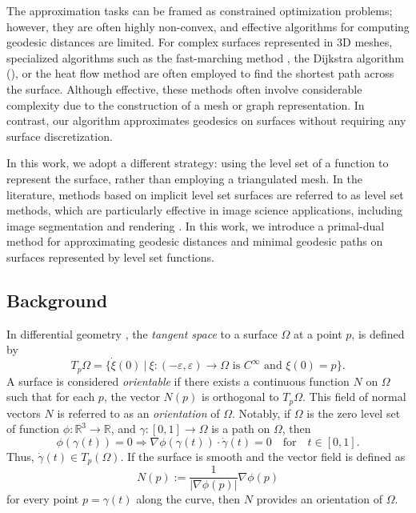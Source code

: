 \documentclass[12pt]{amsart}
\newcommand{\R}{\mathbb{R}}
\theoremstyle{definition}
\theoremstyle{remark}
\numberwithin{equation}{section}
\numberwithin{equation}{section}
\begin{document}
The approximation tasks can be framed as constrained optimization problems; however, they are often highly non-convex, and effective algorithms for computing geodesic distances are limited. For complex surfaces represented in 3D meshes, specialized algorithms such as the fast-marching method \cite{Kimmel:1998}, the Dijkstra algorithm (\cite{Davis:2019, Mitchell:1987, Memoli:2001}), or the heat flow method \cite{Crane:2013} are often employed to find the shortest path across the surface. Although effective, these methods often involve considerable complexity due to the construction of a mesh or graph representation. In contrast, our algorithm approximates geodesics on surfaces without requiring any surface discretization.



{ In this work, we adopt a different strategy: 
using the level set of a function to represent the surface, rather than employing  a triangulated mesh. In the literature, methods based on implicit level set surfaces are referred to as level set methods, which are particularly effective in image science applications, including image segmentation and rendering \cite{Osher:2003a}. 
In this work,  we introduce a primal-dual method for approximating geodesic distances and minimal geodesic paths on surfaces represented by level set functions. }

\subsection{Background}
In differential geometry \cite{Araujo:2024a}, the \textit{tangent space} to a surface $\Omega$ at a point $p$, is defined by 
\[T_p\Omega = \{\dot{\xi}(0)~|~\xi: (-\varepsilon, \varepsilon)\to \Omega \text{ is } C^{\infty} \text{ and } \xi(0) = p\}.
\]
 A surface is considered \textit{orientable} if there exists a continuous function $N$ on $\Omega$ such that for each $p$, the vector $N(p)$ is orthogonal to $T_p\Omega$. This field of normal vectors $N$ is referred to as an \textit{orientation} of $\Omega$. Notably, if $\Omega$ is the zero level set of function $\phi: \R^3\to \R$,  and $\gamma:[0,1]\to \Omega$ is a path on $\Omega$, then  
 $$
 \phi(\gamma(t))=0 \Rightarrow 
 \nabla \phi(\gamma(t))\cdot \dot \gamma(t)=0 \quad \text{for} \quad t\in [0, 1].   
 $$
 Thus, $\dot \gamma(t) \in T_p(\Omega)$. If the surface is smooth and the vector field is defined as 
\[N(p):=\frac{1}{|\nabla\phi(p)|}\nabla\phi(p)
\]
for every point $p=\gamma(t)$ along the curve, then $N$ provides an orientation of $\Omega$.
 
\end{document}
